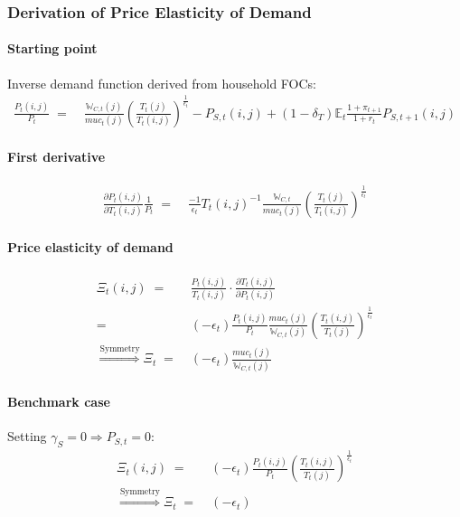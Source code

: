 \documentclass[12pt,3p,authoryear,review]{elsarticle}
\begin{document}
\subsubsection{Derivation of Price Elasticity of Demand}\label{sec:appendix_price_elasticity}%
\begin{small}%
	\paragraph{Starting point} Inverse demand function derived from household FOCs:%
	\begin{align*}%
		\frac{P_t(i,j)}{P_t} \; = & \; \frac{\mathbb{W}_{C,t}(j)}{muc_t(j)} \left(\frac{T_t(j)}{T_t(i,j)}\right)^{\frac{1}{\epsilon_t}} - P_{S,t}(i,j) + \left(1-\delta_T\right) \mathbb{E}_t \frac{1+\pi_{t+1}}{1+r_t} P_{S,t+1}(i,j)%
	\end{align*}%
	\paragraph{First derivative}%
	\begin{align}%
		\frac{\partial P_t(i,j)}{\partial T_t(i,j)} \frac{1}{P_t} \; = & \; \frac{-1}{\epsilon_t} T_t(i,j)^{-1} \frac{\mathbb{W}_{C,t}}{muc_t(j)}\left(\frac{T_t(j)}{T_t(i,j)}\right)^{\frac{1}{\epsilon_t}}%
	\end{align}%
	\paragraph{Price elasticity of demand}%
	\begin{align}%
		\Xi_{t}(i,j) \; = & \; \frac{P_t(i,j)}{T_t(i,j)} \cdot \frac{\partial T_t(i,j)}{\partial P_t(i,j)}\\%
		= & \; (-\epsilon_t) \frac{P_t(i,j)}{P_t} \frac{muc_t(j)}{\mathbb{W}_{C,t}(j)} \left(\frac{T_t(i,j)}{T_t(j)}\right)^{\frac{1}{\epsilon_t}}\\%
		\overset{\text{Symmetry}}{\Rightarrow} \Xi_{t} \; = & \; (-\epsilon_t) \frac{muc_t(j)}{\mathbb{W}_{C,t}(j)}%
	\end{align}%
	\paragraph{Benchmark case} Setting $\gamma_S=0 \Rightarrow P_{S,t} = 0$:%
	\begin{align}%
		\Xi_{t}(i,j) \; = & \; (-\epsilon_t) \frac{P_t(i,j)}{P_t} \left(\frac{T_t(i,j)}{T_t(j)}\right)^{\frac{1}{\epsilon_t}}\\%
		\overset{\text{Symmetry}}{\Rightarrow} \Xi_{t} \; = & \; (-\epsilon_t)%
	\end{align}%

\end{small}
\end{document}
